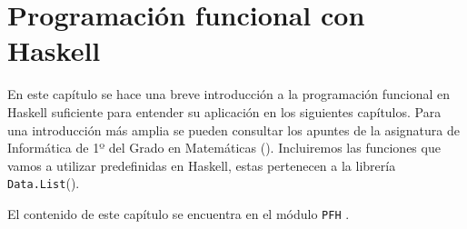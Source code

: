 \chapter{Programación funcional con Haskell}\label{sec:progfunHas}

En este capítulo se hace una breve introducción a la programación funcional en
Haskell suficiente para entender su aplicación en los siguientes
capítulos. Para una introducción más amplia se pueden consultar los apuntes de
la asignatura de Informática de 1º del Grado en Matemáticas
(\cite{Alonso-15b}). Incluiremos las funciones que vamos a utilizar predefinidas en Haskell, estas pertenecen a la librería \texttt{Data.List}(\cite{datalist}).

El contenido de este capítulo se encuentra en el módulo \texttt{PFH} 
.

